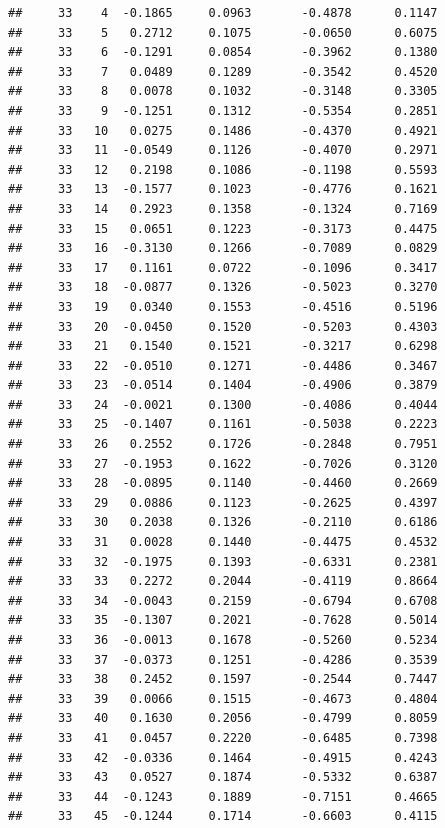 \documentclass[
]{article}
\begin{document}
\begin{verbatim}
##     33    4  -0.1865     0.0963       -0.4878      0.1147 
##     33    5   0.2712     0.1075       -0.0650      0.6075 
##     33    6  -0.1291     0.0854       -0.3962      0.1380 
##     33    7   0.0489     0.1289       -0.3542      0.4520 
##     33    8   0.0078     0.1032       -0.3148      0.3305 
##     33    9  -0.1251     0.1312       -0.5354      0.2851 
##     33   10   0.0275     0.1486       -0.4370      0.4921 
##     33   11  -0.0549     0.1126       -0.4070      0.2971 
##     33   12   0.2198     0.1086       -0.1198      0.5593 
##     33   13  -0.1577     0.1023       -0.4776      0.1621 
##     33   14   0.2923     0.1358       -0.1324      0.7169 
##     33   15   0.0651     0.1223       -0.3173      0.4475 
##     33   16  -0.3130     0.1266       -0.7089      0.0829 
##     33   17   0.1161     0.0722       -0.1096      0.3417 
##     33   18  -0.0877     0.1326       -0.5023      0.3270 
##     33   19   0.0340     0.1553       -0.4516      0.5196 
##     33   20  -0.0450     0.1520       -0.5203      0.4303 
##     33   21   0.1540     0.1521       -0.3217      0.6298 
##     33   22  -0.0510     0.1271       -0.4486      0.3467 
##     33   23  -0.0514     0.1404       -0.4906      0.3879 
##     33   24  -0.0021     0.1300       -0.4086      0.4044 
##     33   25  -0.1407     0.1161       -0.5038      0.2223 
##     33   26   0.2552     0.1726       -0.2848      0.7951 
##     33   27  -0.1953     0.1622       -0.7026      0.3120 
##     33   28  -0.0895     0.1140       -0.4460      0.2669 
##     33   29   0.0886     0.1123       -0.2625      0.4397 
##     33   30   0.2038     0.1326       -0.2110      0.6186 
##     33   31   0.0028     0.1440       -0.4475      0.4532 
##     33   32  -0.1975     0.1393       -0.6331      0.2381 
##     33   33   0.2272     0.2044       -0.4119      0.8664 
##     33   34  -0.0043     0.2159       -0.6794      0.6708 
##     33   35  -0.1307     0.2021       -0.7628      0.5014 
##     33   36  -0.0013     0.1678       -0.5260      0.5234 
##     33   37  -0.0373     0.1251       -0.4286      0.3539 
##     33   38   0.2452     0.1597       -0.2544      0.7447 
##     33   39   0.0066     0.1515       -0.4673      0.4804 
##     33   40   0.1630     0.2056       -0.4799      0.8059 
##     33   41   0.0457     0.2220       -0.6485      0.7398 
##     33   42  -0.0336     0.1464       -0.4915      0.4243 
##     33   43   0.0527     0.1874       -0.5332      0.6387 
##     33   44  -0.1243     0.1889       -0.7151      0.4665 
##     33   45  -0.1244     0.1714       -0.6603      0.4115 

\end{verbatim}
\end{document}
